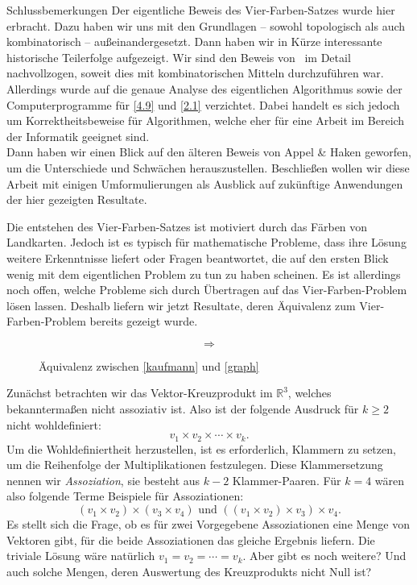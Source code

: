 \begin{chapter}{Schlussbemerkungen}
 Der eigentliche Beweis des Vier-Farben-Satzes wurde hier erbracht. Dazu haben wir uns mit den Grundlagen -- sowohl topologisch als auch kombinatorisch -- außeinandergesetzt. Dann haben wir in Kürze interessante historische Teilerfolge aufgezeigt. Wir sind den Beweis von \rsst\-\  im Detail nachvollzogen, soweit dies mit kombinatorischen Mitteln durchzuführen war. Allerdings wurde auf die genaue Analyse des eigentlichen Algorithmus sowie der Computerprogramme für \ref{4.9} und \ref{2.1} verzichtet. Dabei handelt es sich jedoch um Korrektheitsbeweise für Algorithmen, welche eher für eine Arbeit im Bereich der Informatik geeignet sind.\\
 Dann haben wir einen Blick auf den älteren Beweis von Appel \& Haken geworfen, um die Unterschiede und Schwächen herauszustellen. Beschließen wollen wir diese Arbeit mit einigen Umformulierungen als Ausblick auf zukünftige Anwendungen der hier gezeigten Resultate.

 Die entstehen des Vier-Farben-Satzes ist motiviert durch das Färben von Landkarten. Jedoch ist es typisch für mathematische Probleme, dass ihre Lösung weitere Erkenntnisse liefert oder Fragen beantwortet, die auf den ersten Blick wenig mit dem eigentlichen Problem zu tun zu haben scheinen. Es ist allerdings noch offen, welche Probleme sich durch Übertragen auf das Vier-Farben-Problem lösen lassen. Deshalb liefern wir jetzt Resultate, deren Äquivalenz zum Vier-Farben-Problem bereits gezeigt wurde.
 
 \begin{figure}[hb]
  \label{kaufmannaequiv}
  \[  \Rightarrow  \]
  \caption[Äquivalenz zwischen \ref{kaufmann} und \ref{graph}]{Äquivalenz zwischen \ref{kaufmann} und \ref{graph}}
 \end{figure}

 Zunächst betrachten wir das Vektor-Kreuzprodukt im $\mathbb{R}^3$, welches bekanntermaßen nicht assoziativ ist. Also ist der folgende Ausdruck für $k \geq 2$ nicht wohldefiniert:
 \[ v_1 \times v_2 \times \cdots \times v_k \text{.}\]
 Um die Wohldefiniertheit herzustellen, ist es erforderlich, Klammern zu setzen, um die Reihenfolge der Multiplikationen festzulegen. Diese Klammersetzung nennen wir \textit{Assoziation}, sie besteht aus $k-2$ Klammer-Paaren. Für $k=4$ wären also folgende Terme Beispiele für Assoziationen:
 \[ (v_1 \times v_2) \times (v_3 \times v_4) \text{ und } ((v_1 \times v_2) \times v_3) \times v_4 \text{.}\]
 Es stellt sich die Frage, ob es für zwei Vorgegebene Assoziationen eine Menge von Vektoren gibt, für die beide Assoziationen das gleiche Ergebnis liefern. Die triviale Lösung wäre natürlich $v_1 = v_2 = \cdots = v_k$. Aber gibt es noch weitere? Und auch solche Mengen, deren Auswertung des Kreuzprodukts nicht Null ist?
 

\end{chapter}
